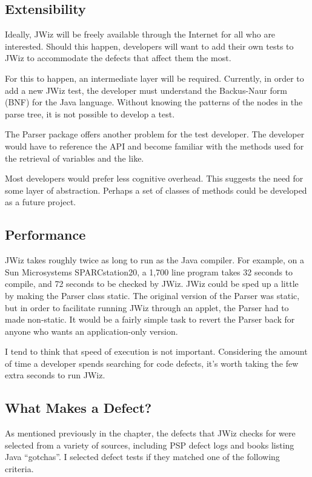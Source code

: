 \subsection{Extensibility}
Ideally, JWiz will be freely available through the Internet for all who are
interested.  Should this happen, developers will want to add their own
tests to JWiz to accommodate the defects that affect them the most.

For this to happen, an intermediate layer will be required.  Currently, in
order to add a new JWiz test, the developer must understand the Backus-Naur
form (BNF) for the Java language.  Without knowing the patterns of the
nodes in the parse tree, it is not possible to develop a test.

The Parser package offers another problem for the test developer.  The
developer would have to reference the API and become familiar with the
methods used for the retrieval of variables and the like.

Most developers would prefer less cognitive overhead.  This suggests the
need for some layer of abstraction.  Perhaps a set of classes of methods
could be developed as a future project.

\subsection{Performance}
JWiz takes roughly twice as long to run as the Java compiler.  For example,
on a Sun Microsystems SPARCstation20, a 1,700 line program takes 32 seconds
to compile, and 72 seconds to be checked by JWiz.  JWiz could be sped up a
little by making the Parser class static.  The original version of the
Parser was static, but in order to facilitate running JWiz through an
applet, the Parser had to made non-static.  It would be a fairly simple
task to revert the Parser back for anyone who wants an application-only
version.

I tend to think that speed of execution is not important.  Considering
the amount of time a developer spends searching for code defects, it's
worth taking the few extra seconds to run JWiz.

\subsection{What Makes a Defect?} 
As mentioned previously in the chapter, the defects that JWiz checks for
were selected from a variety of sources, including PSP defect logs and
books listing Java ``gotchas''.  I selected defect tests if they matched
one of the following criteria.

